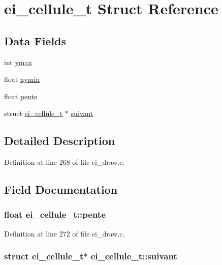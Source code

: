 \hypertarget{structei__cellule__t}{\section{ei\-\_\-cellule\-\_\-t Struct Reference}
\label{structei__cellule__t}
}
\subsection*{Data Fields}
\begin{DoxyCompactItemize}
\item 
int \hyperlink{structei__cellule__t_ac8f000cde6f76158c7360bcac0345ba3}{ymax}
\item 
float \hyperlink{structei__cellule__t_a761ea1a88e22989260c847ce0a123fb6}{xymin}
\item 
float \hyperlink{structei__cellule__t_acba2e9c7b765f2326a839d0d349149bb}{pente}
\item 
struct \hyperlink{structei__cellule__t}{ei\-\_\-cellule\-\_\-t} $\ast$ \hyperlink{structei__cellule__t_a7ec546f9430221d55dc44ffd340893d1}{suivant}
\end{DoxyCompactItemize}


\subsection{Detailed Description}


Definition at line 268 of file ei\-\_\-draw.\-c.



\subsection{Field Documentation}
\hypertarget{structei__cellule__t_acba2e9c7b765f2326a839d0d349149bb}{
\subsubsection[{pente}]{\setlength{\rightskip}{0pt plus 5cm}float ei\-\_\-cellule\-\_\-t\-::pente}}\label{structei__cellule__t_acba2e9c7b765f2326a839d0d349149bb}


Definition at line 272 of file ei\-\_\-draw.\-c.

\hypertarget{structei__cellule__t_a7ec546f9430221d55dc44ffd340893d1}{
\subsubsection[{suivant}]{\setlength{\rightskip}{0pt plus 5cm}struct {\bf ei\-\_\-cellule\-\_\-t}$\ast$ ei\-\_\-cellule\-\_\-t\-::suivant}}\label{structei__cellule__t_a7ec546f9430221d55dc44ffd340893d1}


